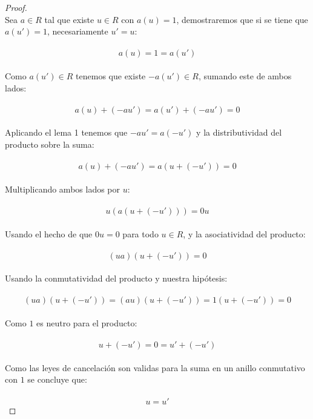 \documentclass[11pt,letterpaper]{article}
\begin{document}
\begin{proof}\,\\
    Sea $a\in R$ tal que existe $u\in R$ con $a(u)=1$, demostraremos que si se tiene que $a(u')=1$, necesariamente $u'=u$:\,\\
    \,\\
    \begin{equation*}
        a(u)=1=a(u')
    \end{equation*}\,\\
    Como $a(u')\in R$ tenemos que existe $-a(u')\in R$, sumando este de ambos lados:\,\\
    \,\\
    \begin{equation*}
        a(u)+(-au')=a(u')+(-au')=0
    \end{equation*}\,\\
    Aplicando el lema 1 tenemos que $-au'=a(-u')$ y la distributividad del producto sobre la suma:\,\\
    \,\\
    \begin{equation*}
        a(u)+(-au')=a(u+(-u'))=0
    \end{equation*}\,\\
    Multiplicando ambos lados por $u$:\,\\
    \,\\
    \begin{equation*}
        u(a(u+(-u')))=0u
    \end{equation*}\,\\
    Usando el hecho de que $0u=0$ para todo $u\in R$, y la asociatividad del producto:\,\\
    \,\\
    \begin{equation*}
        (ua)(u+(-u'))=0
    \end{equation*}\,\\
    Usando la conmutatividad del producto y nuestra hip\'otesis:\,\\
    \,\\
    \begin{equation*}
        (ua)(u+(-u'))=(au)(u+(-u'))=1(u+(-u'))=0
    \end{equation*}\,\\
    Como $1$ es neutro para el producto:\,\\
    \,\\
    \begin{equation*}
        u+(-u')=0=u'+(-u')
    \end{equation*}\,\\
    Como las leyes de cancelaci\'on son validas para la suma en un anillo conmutativo con $1$ se concluye que:\,\\
    \,\\
    \begin{equation*}
        u=u'
    \end{equation*}
\end{proof}\,\\
\end{document}

